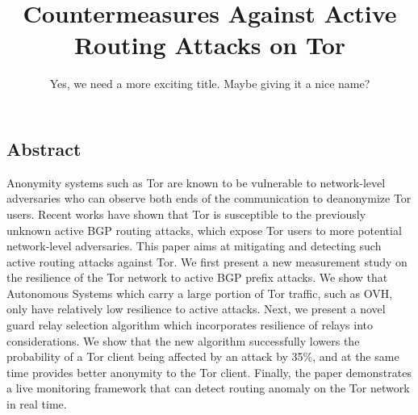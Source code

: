 \documentclass[letterpaper,twocolumn,10pt]{article}
\begin{document}
\date{}

\title{\Large \bf Countermeasures Against Active Routing Attacks on Tor}
\author{Yes, we need a more exciting title. Maybe giving it a nice name?}


\maketitle

\thispagestyle{empty}

\subsection*{Abstract}
Anonymity systems such as Tor are known to be vulnerable to network-level adversaries who can observe both ends of the communication to deanonymize Tor users. Recent works have shown that Tor is susceptible to the previously unknown active BGP routing attacks, which expose Tor users to more potential network-level adversaries. This paper aims at mitigating and detecting such active routing attacks against Tor. We first present a new measurement study on the resilience of the Tor network to active BGP prefix attacks. We show that Autonomous Systems which carry a large portion of Tor traffic, such as OVH, only have relatively low resilience to active attacks. Next, we present a novel guard relay selection algorithm which incorporates resilience of relays into considerations. We show that the new algorithm successfully lowers the probability of a Tor client being affected by an attack by 35\%, and at the same time provides better anonymity to the Tor client. Finally, the paper demonstrates a live monitoring framework that can detect routing anomaly on the Tor network in real time. 








%
%


{\footnotesize 
}

\end{document}
